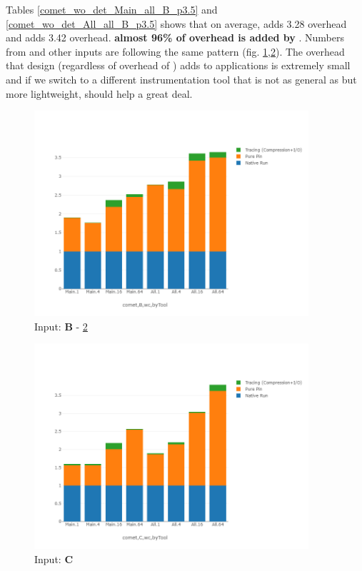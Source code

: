 Tables \ref{comet_wo_det_Main_all_B_p3.5} and \ref{comet_wo_det_All_all_B_p3.5} shows that on average, \pininit adds 3.28 overhead and \parlota adds 3.42 overhead. \textbf{almost 96\% of \parlota overhead is added by \pininit} . Numbers from \parlotm and other inputs are following the same pattern (fig. \ref{comet_chartDet_B_wc_byTool_p3_5},\ref{comet_chartDet_C_wc_byTool_p3_5}).
The overhead that \parlot design (regardless of overhead of \pininit) adds to applications is extremely small and if we switch to a different instrumentation tool that is not as general as \pin but more lightweight, should help a great deal. \\





\begin{figure}[!t]
\centering
\includegraphics[width=4in]{figs.comet.newMed/comet_chartDet_B_wc_byTool_p3_5.png}
\caption{ Input: \textbf{B} - \ref{comet_chartDet_C_wc_byTool_p3_5} 
}
\label{comet_chartDet_B_wc_byTool_p3_5}
\end{figure}


\begin{figure}[!t]
\centering
\includegraphics[width=4in]{figs.comet.newMed/comet_chartDet_C_wc_byTool_p3_5.png}
\caption{ Input: \textbf{C}
}
\label{comet_chartDet_C_wc_byTool_p3_5}
\end{figure}






